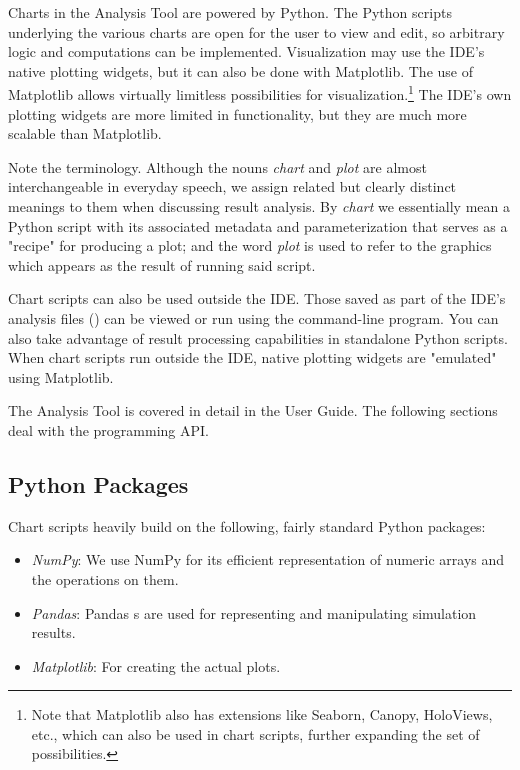 Charts in the Analysis Tool are powered by Python. The Python scripts underlying
the various charts are open for the user to view and edit, so arbitrary logic
and computations can be implemented. Visualization may use the IDE's native
plotting widgets, but it can also be done with Matplotlib. The use of Matplotlib
allows virtually limitless possibilities for visualization.\footnote{Note that
Matplotlib also has extensions like Seaborn, Canopy, HoloViews, etc., which can
also be used in chart scripts, further expanding the set of possibilities.} The IDE's
own plotting widgets are more limited in functionality, but they are much more
scalable than Matplotlib.

\begin{note}
Note the terminology. Although the nouns \textit{chart} and \textit{plot} are
almost interchangeable in everyday speech, we assign related but clearly
distinct meanings to them when discussing {\opp} result analysis. By
\textit{chart} we essentially mean a Python script with its associated metadata
and parameterization that serves as a "recipe" for producing a plot; and the
word \textit{plot} is used to refer to the graphics which appears as the result
of running said script.
\end{note}

Chart scripts can also be used outside the IDE. Those saved as part of the IDE's
analysis files () can be viewed or run using the 
command-line program. You can also take advantage of result processing
capabilities in standalone Python scripts. When chart scripts run outside the IDE,
native plotting widgets are "emulated" using Matplotlib.

The Analysis Tool is covered in detail in the User Guide. The following sections
deal with the programming API.


\subsection{Python Packages}
\label{sec:ana-sim:python_packages}

Chart scripts heavily build on the following, fairly standard Python packages:

\begin{itemize}
  \item \textit{NumPy}: We use NumPy for its efficient representation of numeric
    arrays and the operations on them.
  \item \textit{Pandas}: Pandas s are used for representing and
    manipulating simulation results.
  \item \textit{Matplotlib}: For creating the actual plots.
\end{itemize}

